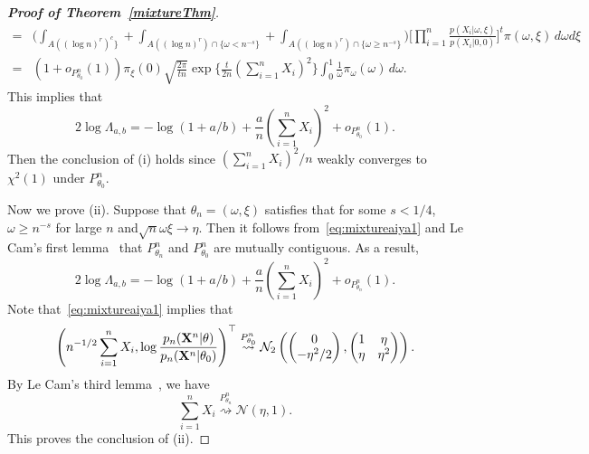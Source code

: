 \documentclass[11pt]{article}
\theoremstyle{plain}
\theoremstyle{definition}
\theoremstyle{remark}
\begin{document}
\begin{appendices}
\begin{proof}[\textbf{Proof of Theorem~\ref{mixtureThm}}]
\begin{align*}
=& \bigg( \int_{A( (\log n)^r )^c\}}+\int_{A( (\log n)^r )\cap \{\omega< n^{-s}\}}+\int_{A( (\log n)^r )\cap \{\omega\geq n^{-s}\}}\bigg) \Big[\prod_{i=1}^n \frac{p(X_i|\omega,\xi)}{p(X_i|0,0)}\Big]^t \pi(\omega,\xi)\, d\omega d\xi
    \\
    =&
    (1+o_{P^n_{\theta_0}}(1))\pi_{\xi}(0)\sqrt{\frac{2\pi}{tn}}\exp \Big\{ \frac{t}{2n}(\sum_{i=1}^n X_i)^2\Big\} 
\int_{0}^1 
\frac{1}{\omega}
\pi_{\omega}(\omega)\, d\omega.
\end{align*}
This implies that
\begin{equation*}
    2\log \Lambda_{a,b}=-\log(1+a/b)+\frac{a}{n}(\sum_{i=1}^n X_i)^2+o_{P^n_{\theta_0}}(1).
\end{equation*}
Then the conclusion of (i) holds since $(\sum_{i=1}^n X_i)^2/n$ weakly converges to $ \chi^2(1)$ under $P^n_{\theta_0}$.

Now we prove (ii). Suppose that $\theta_n=(\omega,\xi)$ satisfies that for some $s<1/4$, $\omega\geq n^{-s}$ for large $n$ and$\sqrt{n}\omega \xi \to \eta$.
Then it follows from~\eqref{eq:mixtureaiya1} and Le Cam's first lemma~\citep[Theorem 6.4]{van2000asymptotic} that
$P^n_{\theta_n}$ and $P^n_{\theta_0}$ are mutually contiguous.
As a result,
\begin{equation*}
    2\log \Lambda_{a,b}=-\log(1+a/b)+\frac{a}{n}(\sum_{i=1}^n X_i)^2+o_{P^n_{\theta_n}}(1).
\end{equation*}
Note that~\eqref{eq:mixtureaiya1} implies that
\begin{equation*}
        \left(n^{-1/2}\sum_{i=1}^n X_i,\log \frac{p_n(\mathbf{X}^{n}|\theta)}{p_n(\mathbf{X}^{n}|\theta_0)}\right)^\top 
        \overset{P^n_{\theta_0}}{\rightsquigarrow}
        \mathcal{N}_2\left(
    \begin{pmatrix}
        0\\
        -{\eta^2}/{2}
    \end{pmatrix}
    ,
    \begin{pmatrix}
        1 & \eta\\
        \eta & \eta^2
    \end{pmatrix}
\right).
\end{equation*}
By Le Cam's third lemma~\citep[Example 6.7]{van2000asymptotic}, we have
\begin{equation*}
    \sum_{i=1}^n X_i
    \overset{P^n_{\theta_n}}{\rightsquigarrow} \mathcal{N}(\eta,1).
\end{equation*}
This proves the conclusion of (ii).

\end{proof}

\end{appendices}
\end{document}

